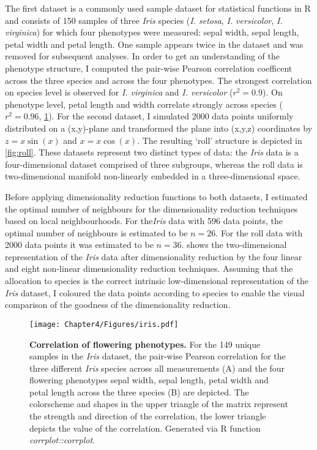The first dataset is a commonly used sample dataset for statistical functions in R and consists of \num{150} samples of three \textit{Iris} species (\textit{I. setosa}, \textit{I. versicolor}, \textit{I. virginica}) for which four phenotypes were measured:  sepal width, sepal length, petal width and petal length. One sample appears twice in the dataset and was removed for subsequent analyses. In order to get an understanding of the phenotype structure, I computed the pair-wise Pearson correlation coefficent across the three species and across the four phenotypes. The strongest correlation on species level is observed for  \textit{I. virginica} and \textit{I. versicolor} (\(r^2=0.9\)). On phenotype level, petal length and width correlate strongly across species (\(r^2=0.96\), \cref{fig:iris}). For the second dataset, I simulated \num{2000} data points uniformly distributed on a (x,y)-plane and transformed the plane into (x,y,z) coordinates by \(z = x \sin(x)\) and \(x = x \cos(x)\). The resulting `roll' structure is depicted in \cref{fig:roll}. These datasets represent two distinct types of data: the \textit{Iris} data is a four-dimensional dataset comprised of three subgroups, whereas the roll data is two-dimensional manifold non-linearly embedded in a three-dimensional space. 

Before applying dimensionality reduction functions to both datasets, I estimated the optimal number of neighbours for the dimensionality reduction techniques based on local neighbourhoods. For the\textit{Iris} data with \num{596} data points, the optimal number of neighbours is estimated to be \(n=26\). For the roll data with \num{2000} data points it was estimated to be \(n=36\).  shows the two-dimensional representation of the \textit{Iris} data after dimensionality reduction by the four linear and eight non-linear dimensionality reduction techniques. Assuming that the allocation to species is the correct intrinsic low-dimensional representation of the \textit{Iris} dataset, I coloured the data points according to species to enable the visual comparison of the goodness of the dimensionality reduction.

\begin{figure}[h]
	\centering
			\texttt{[image: Chapter4/Figures/iris.pdf]}		
	\caption[\textbf{Correlation of flowering phenotypes.}]{\textbf{Correlation of flowering phenotypes.} For the \num{149} unique samples in the \textit{Iris} dataset, the pair-wise  Pearson correlation for the three different \textit{Iris} species across all measurements (A) and the four flowering phenotypes sepal width, sepal length, petal width and petal length across the three species (B) are depicted. The colorscheme and shapes in the upper triangle of the matrix represent the strength and direction of the correlation, the lower triangle depicts the value of the correlation. Generated via R function \textit{corrplot::corrplot}.} 
		\label{fig:iris}
\end{figure}%

